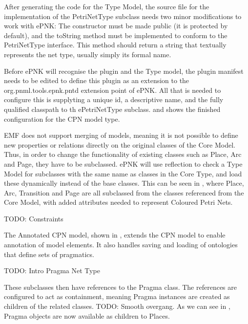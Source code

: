 After generating the code for the Type Model, the source file for
the implementation of the PetriNetType subclass needs two minor modifications
to work with ePNK: The constructor must be made public (it is protected by
default), and the toString method must be implemented to conform to the
PetriNetType interface. This method should return a string that textually
represents the net type, usually simply its formal name.

Before ePNK will recognise the plugin and the Type model, the plugin manifest
needs to be edited to define this plugin as an extension to the
org.pnml.tools.epnk.pntd extension point of ePNK. All that is needed to
configure this is supplyting a unique id, a descriptive name, and the fully
qualified classpath to th ePetriNetType subclass.  and
 shows the finished configuration for the CPN model
type. 

EMF does not support merging of models, meaning it is not possible to define new
properties or relations directly on the original classes of the Core Model.
Thus, in order to change the functionality of existing classes such as Place,
Arc and Page, they have to be subclassed. ePNK will use reflection to check a
Type Model for subclasses with the same name as classes in the Core Type, and
load these dynamically instead of the base classes.
This can be seen in , where Place, Arc, Transition and Page are all
subclassed from the classes referenced from the Core Model, with added
attributes needed to represent Coloured Petri Nets.

TODO: Constraints

The Annotated CPN model, shown in , extends the CPN
model to enable annotation of model elements. It also handles saving and loading
of ontologies that define sets of pragmatics.

TODO: Intro Pragma Net Type

These subclasses then have references to the Pragma class. The references are
configured to act as containment, meaning Pragma instances are created as
children of the related classes. TODO: Smooth overgang. As we can see in
, Pragma objects are now available as children to Places.

